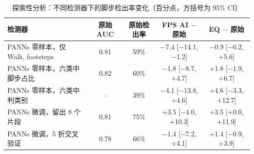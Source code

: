 \begin{table}[htbp]\centering
\caption{探索性分析：不同检测器下的脚步检出率变化（百分点，方括号为 95\% CI）}\label{tab:detect}
{\footnotesize\begin{threeparttable}
\begin{tabular}{lcccc}\toprule
检测器 & 原始 AUC & 原始检出率 & FPS AI $-$ 原始 & EQ $-$ 原始 \\
\midrule
PANNs 零样本，仅 Walk, footsteps & 0.81 & 59\% & $-$7.4 [$-$14.1, $-$1.2] & $-$0.9 [$-$6.2, $+$5.6] \\
PANNs 零样本，六类中脚步占比 & 0.82 & 60\% & $-$1.8 [$-$8.7, $+$4.7] & $+$1.8 [$-$1.9, $+$6.7] \\
PANNs 零样本，六类中判类别 & -- & 39\% & $-$4.1 [$-$13.8, $+$4.6] & $+$4.6 [$-$3.3, $+$12.7] \\
PANNs 微调，留出 8 个片段 & 0.81 & 75\% & $+$3.5 [$-$4.0, $+$10.3] & $+$3.5 [$+$0.0, $+$11.9] \\
PANNs 微调，5 折交叉验证 & 0.78 & 66\% & $-$1.4 [$-$7.2, $+$4.1] & $+$1.4 [$-$0.9, $+$3.9] \\
\bottomrule\end{tabular}
\end{threeparttable}}
\end{table}
